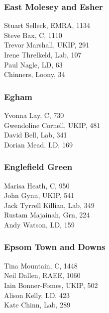 \documentclass[a4paper,openany,10pt]{book}
\begin{document}
\subsubsection*{East Molesey and Esher}



Stuart Selleck, EMRA, 1134\\
Steve Bax, C, 1110\\
Trevor Marshall, UKIP, 291\\
Irene Threlkeld, Lab, 107\\
Paul Nagle, LD, 63\\
Chinners, Loony, 34\\


\subsubsection*{Egham}



Yvonna Lay, C, 730\\
Gwendoline Cornell, UKIP, 481\\
David Bell, Lab, 341\\
Dorian Mead, LD, 169\\


\subsubsection*{Englefield Green}



Marisa Heath, C, 950\\
John Gynn, UKIP, 541\\
Jack Tyrrell Killian, Lab, 349\\
Rustam Majainah, Grn, 224\\
Andy Watson, LD, 159\\


\subsubsection*{Epsom Town and Downs}



Tina Mountain, C, 1448\\
Neil Dallen, RAEE, 1060\\
Iain Bonner-Fomes, UKIP, 502\\
Alison Kelly, LD, 423\\
Kate Chinn, Lab, 289\\
\end{document}
